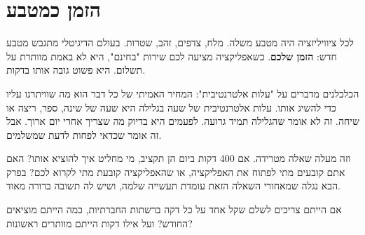 \section{הזמן כמטבע}

לכל ציוויליזציה היה מטבע משלה. מלח, צדפים, זהב, שטרות. בעולם הדיגיטלי מתגבש מטבע חדש: \textbf{הזמן שלכם}. כשאפליקציה מציעה לכם שירות "בחינם", היא לא באמת מוותרת על תשלום. היא פשוט גובה אותו בדקות.

הכלכלנים מדברים על "עלות אלטרנטיבית": המחיר האמיתי של כל דבר הוא מה שוויתרנו עליו כדי להשיג אותו. עלות אלטרנטיבית של שעה בגלילה היא שעה של שינה, ספר, ריצה או שיחה. זה לא אומר שהגלילה תמיד גרועה. לפעמים היא בדיוק מה שצריך אחרי יום ארוך. אבל זה אומר שכדאי לפחות לדעת שמשלמים.

וזה מעלה שאלה מטרידה. אם 400 דקות ביום הן תקציב, מי מחליט איך להוציא אותו? האם אתם קובעים מתי לפתוח את האפליקציה, או שהאפליקציה קובעת מתי לקרוא לכם? בפרק הבא נגלה שמאחורי השאלה הזאת עומדת תעשייה שלמה, ושיש לה תשובה ברורה מאוד.

\begin{thinkbox}
אם הייתם צריכים לשלם שקל אחד על כל דקה ברשתות החברתיות, כמה הייתם מוציאים החודש? ועל אילו דקות הייתם מוותרים ראשונות?
\end{thinkbox}
